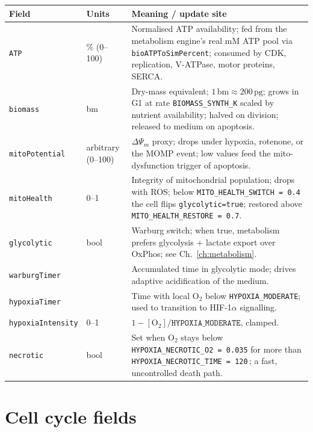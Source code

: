 \documentclass[11pt,letterpaper,twoside,openany]{book}
\newcommand{\code}[1]{\texttt{#1}}
\newcommand{\biosec}{\text{bio-s}}
\begin{document}
\begin{longtable}{p{3.3cm} p{2.2cm} p{7.5cm}}
\toprule
\textbf{Field} & \textbf{Units} & \textbf{Meaning / update site}\\ \midrule
\code{ATP}            & \% (0--100) & Normalised ATP availability; fed from the metabolism engine's real mM ATP pool via \code{bioATPToSimPercent}; consumed by CDK, replication, V-ATPase, motor proteins, SERCA.\\
\code{biomass}        & bm     & Dry-mass equivalent; $1\,\text{bm} \approx 200\,\text{pg}$; grows in G1 at rate \code{BIOMASS\_SYNTH\_K} scaled by nutrient availability; halved on division; released to medium on apoptosis.\\
\code{mitoPotential}  & arbitrary (0--100) & $\Delta\Psi_m$ proxy; drops under hypoxia, rotenone, or the MOMP event; low values feed the mito-dysfunction trigger of apoptosis.\\
\code{mitoHealth}     & 0--1   & Integrity of mitochondrial population; drops with ROS; below \code{MITO\_HEALTH\_SWITCH = 0.4} the cell flips \code{glycolytic=true}; restored above \code{MITO\_HEALTH\_RESTORE = 0.7}.\\
\code{glycolytic}     & bool   & Warburg switch; when true, metabolism prefers glycolysis + lactate export over OxPhos; see Ch.~\ref{ch:metabolism}.\\
\code{warburgTimer}   & \biosec & Accumulated time in glycolytic mode; drives adaptive acidification of the medium.\\
\code{hypoxiaTimer}   & \biosec & Time with local O$_2$ below \code{HYPOXIA\_MODERATE}; used to transition to HIF-1$\alpha$ signalling.\\
\code{hypoxiaIntensity}& 0--1  & $1 - [\text{O}_2]/\code{HYPOXIA\_MODERATE}$, clamped.\\
\code{necrotic}       & bool   & Set when O$_2$ stays below \code{HYPOXIA\_NECROTIC\_O2 = 0.035} for more than \code{HYPOXIA\_NECROTIC\_TIME = 120}\,\biosec; a fast, uncontrolled death path.\\
\bottomrule
\end{longtable}

\section{Cell cycle fields}
\end{document}
